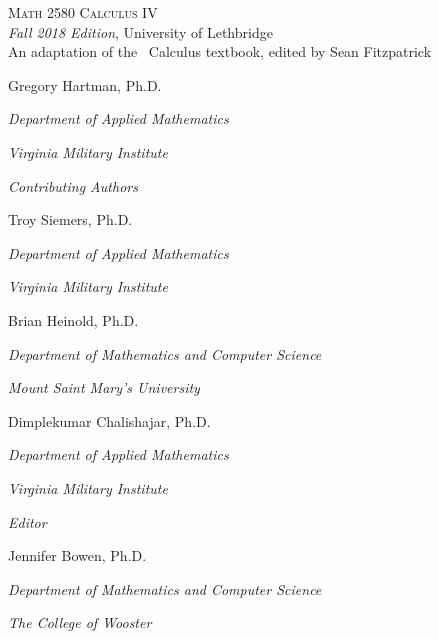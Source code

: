 
\hskip 125pt\begin{minipage}{\textwidth}
\begin{flushright}

\textsc{{\Huge Math 2580 Calculus IV}} \\

\textsl{\large Fall 2018 Edition}, 
{\large University of Lethbridge}\\

{An adaptation of the \apex\ Calculus textbook, edited by Sean Fitzpatrick}

\bigskip

\Large

Gregory Hartman, Ph.D.

\emph{\small Department of Applied Mathematics}

\emph{\small Virginia Military Institute}\vskip15pt




\parbox{200pt}{\textit{Contributing Authors}}\hskip 2cm \phantom{.}

Troy Siemers, Ph.D.

\emph{\small Department of Applied Mathematics}

\emph{\small Virginia Military Institute}\vskip 15pt

Brian Heinold, Ph.D.

\emph{\small Department of Mathematics and Computer Science}

\emph{\small Mount Saint Mary's University}\vskip 15pt

Dimplekumar Chalishajar, Ph.D.

\emph{\small Department of Applied Mathematics}

\emph{\small Virginia Military Institute}\vskip 25pt



\parbox{200pt}{\textit{Editor}}\hskip 2cm \phantom{.}

Jennifer Bowen, Ph.D.

\emph{\small Department of Mathematics and Computer Science}

\emph{\small The College of Wooster}


\normalsize
\end{flushright}
\end{minipage}

